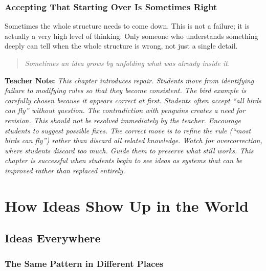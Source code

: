 \documentclass[12pt]{book}
\newenvironment{teachernote}
{\par\medskip\noindent\textbf{Teacher Note:} \itshape}
{\par\medskip}
\begin{document}
\section{Accepting That Starting Over Is Sometimes Right}

Sometimes the whole structure needs to come down. This is not a failure;
it is actually a very high level of thinking. Only someone who understands
something deeply can tell when the whole structure is wrong, not just a
single detail.

\begin{quote}\itshape
Sometimes an idea grows by unfolding what was already inside it.
\end{quote}

\begin{teachernote}
This chapter introduces repair. Students move from identifying failure
to modifying rules so that they become consistent. The bird example is
carefully chosen because it appears correct at first. Students often
accept ``all birds can fly'' without question. The contradiction with
penguins creates a need for revision. This should not be resolved
immediately by the teacher. Encourage students to suggest possible fixes.
The correct move is to refine the rule (``most birds can fly'') rather
than discard all related knowledge. Watch for overcorrection, where
students discard too much. Guide them to preserve what still works. This
chapter is successful when students begin to see ideas as systems that
can be improved rather than replaced entirely.
\end{teachernote}

\part{How Ideas Show Up in the World}

\chapter{Ideas Everywhere}

\section{The Same Pattern in Different Places}
\end{document}
